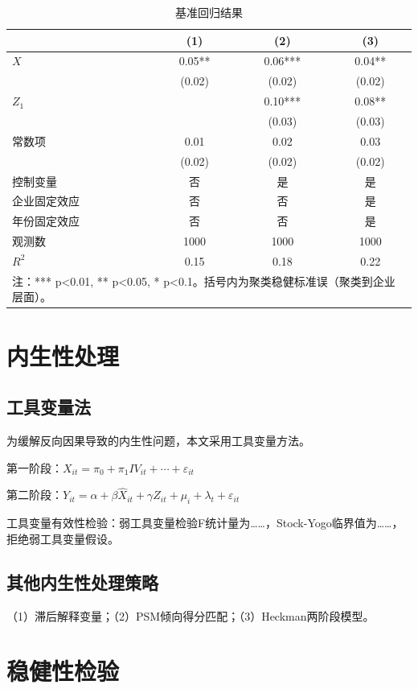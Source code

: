 \documentclass[10pt, UTF8, twocolumn]{ctexart}
\newcommand{\xiaosi}{\fontsize{12pt}{18pt}\selectfont}
\begin{document}
\begin{table}[htbp]
\centering
\caption{基准回归结果}
\label{tab:reg}
\xiaosi
\begin{tabular}{lccc}
\toprule
 & (1) & (2) & (3) \\
\midrule
$X$ & 0.05** & 0.06*** & 0.04** \\
    & (0.02) & (0.02) & (0.02) \\
$Z_1$ & & 0.10*** & 0.08** \\
      &      & (0.03)  & (0.03) \\
\midrule
常数项 & 0.01 & 0.02 & 0.03 \\
       & (0.02) & (0.02) & (0.02) \\
\midrule
控制变量 & 否 & 是 & 是 \\
企业固定效应 & 否 & 否 & 是 \\
年份固定效应 & 否 & 否 & 是 \\
\midrule
观测数 & 1000 & 1000 & 1000 \\
$R^2$ & 0.15 & 0.18 & 0.22 \\
\bottomrule
\multicolumn{4}{l}{\small 注：*** p<0.01, ** p<0.05, * p<0.1。括号内为聚类稳健标准误（聚类到企业层面）。}
\end{tabular}
\end{table}

\section{内生性处理}
\label{sec:endo}

\subsection{工具变量法}
为缓解反向因果导致的内生性问题，本文采用工具变量方法。

第一阶段：$X_{it} = \pi_0 + \pi_1 IV_{it} + \cdots + \varepsilon_{it}$

第二阶段：$Y_{it} = \alpha + \beta \hat{X}_{it} + \gamma Z_{it} + \mu_i + \lambda_t + \varepsilon_{it}$

工具变量有效性检验：弱工具变量检验F统计量为……，Stock-Yogo临界值为……，拒绝弱工具变量假设。

\subsection{其他内生性处理策略}
（1）滞后解释变量；（2）PSM倾向得分匹配；（3）Heckman两阶段模型。

\section{稳健性检验}
\label{sec:robust}
\end{document}
